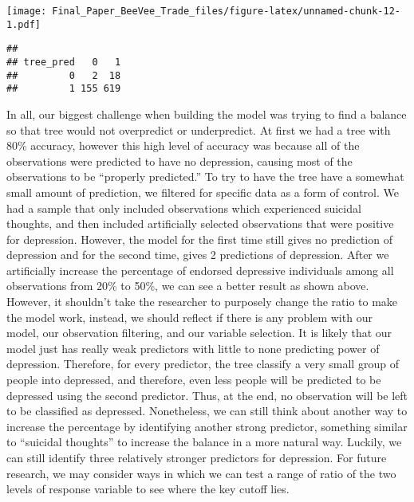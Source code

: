\documentclass[]{article}
\newenvironment{Shaded}{\begin{snugshade}}{\end{snugshade}}
\newcommand{\KeywordTok}[1]{\textcolor[rgb]{0.13,0.29,0.53}{\textbf{#1}}}
\newcommand{\DataTypeTok}[1]{\textcolor[rgb]{0.13,0.29,0.53}{#1}}
\newcommand{\StringTok}[1]{\textcolor[rgb]{0.31,0.60,0.02}{#1}}
\newcommand{\CommentTok}[1]{\textcolor[rgb]{0.56,0.35,0.01}{\textit{#1}}}
\newcommand{\OperatorTok}[1]{\textcolor[rgb]{0.81,0.36,0.00}{\textbf{#1}}}
\newcommand{\NormalTok}[1]{#1}
\begin{document}
\texttt{[image: Final\_Paper\_BeeVee\_Trade\_files/figure-latex/unnamed-chunk-12-1.pdf]}

\begin{Shaded}
\end{Shaded}

\begin{verbatim}
##          
## tree_pred   0   1
##         0   2  18
##         1 155 619
\end{verbatim}

\begin{Shaded}
\end{Shaded}

In all, our biggest challenge when building the model was trying to find
a balance so that tree would not overpredict or underpredict. At first
we had a tree with 80\% accuracy, however this high level of accuracy
was because all of the observations were predicted to have no
depression, causing most of the observations to be ``properly
predicted.'' To try to have the tree have a somewhat small amount of
prediction, we filtered for specific data as a form of control. We had a
sample that only included observations which experienced suicidal
thoughts, and then included artificially selected observations that were
positive for depression. However, the model for the first time still
gives no prediction of depression and for the second time, gives 2
predictions of depression. After we artificially increase the percentage
of endorsed depressive individuals among all observations from 20\% to
50\%, we can see a better result as shown above. However, it shouldn't
take the researcher to purposely change the ratio to make the model
work, instead, we should reflect if there is any problem with our model,
our observation filtering, and our variable selection. It is likely that
our model just has really weak predictors with little to none predicting
power of depression. Therefore, for every predictor, the tree classify a
very small group of people into depressed, and therefore, even less
people will be predicted to be depressed using the second predictor.
Thus, at the end, no observation will be left to be classified as
depressed. Nonetheless, we can still think about another way to increase
the percentage by identifying another strong predictor, something
similar to ``suicidal thoughts'' to increase the balance in a more
natural way. Luckily, we can still identify three relatively stronger
predictors for depression. For future research, we may consider ways in
which we can test a range of ratio of the two levels of response
variable to see where the key cutoff lies.
\end{document}
